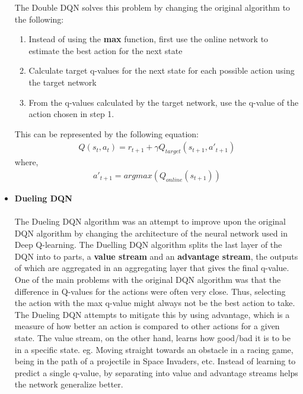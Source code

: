 \documentclass[paper=a4, fontsize=11pt, margin=1in]{scrartcl}
\numberwithin{equation}{section}		%
\numberwithin{figure}{section}			%
\numberwithin{table}{section}				%
\begin{document}
\begin{itemize}
    The Double DQN solves this problem by changing the original algorithm to the following:

    \begin{enumerate}
        \item Instead of using the \textbf{max} function, first use the online network to estimate the best action for the next state
        \item Calculate target q-values for the next state for each possible action using the target network
        \item From the q-values calculated by the target network, use the q-value of the action chosen in step 1.
    \end{enumerate}

    This can be represented by the following equation:
    \begin{align}
	Q(s_t, a_t) = 
			r_{t+1} + \gamma Q_{target}(s_{t+1}, a'_{t+1})
    \end{align}
    where,
    \begin{align}
	a'_{t+1} = argmax({Q_{online}(s_{t+1})})
    \end{align}
    
    
    \item \textbf{Dueling DQN}\\\\
    The Dueling DQN algorithm was an attempt to improve upon the original DQN algorithm by changing the architecture of the neural network used in Deep Q-learning. The Duelling DQN algorithm splits the last layer of the DQN into to parts, a \textbf{value stream} and an \textbf{advantage stream}, the outputs of which are aggregated in an aggregating layer that gives the final q-value. One of the main problems with the original DQN algorithm was that the difference in Q-values for the actions were often very close. Thus, selecting the action with the max q-value might always not be the best action to take. The Dueling DQN attempts to mitigate this by using advantage, which is a measure of how better an action is compared to other actions for a given state.
    The value stream, on the other hand, learns how good/bad it is to be in a specific state. eg. Moving straight towards an obstacle in a racing game, being in the path of a projectile in Space Invaders, etc. Instead of learning to predict a single q-value, by separating into value and advantage streams helps the network generalize better.

    
    

\end{itemize}
\end{document}
